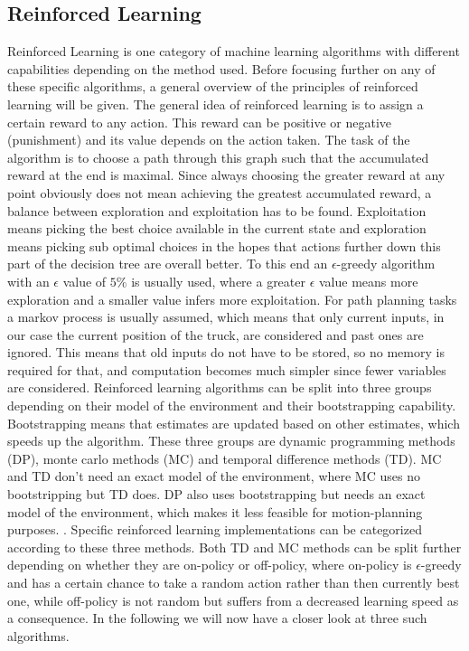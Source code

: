 \subsection{Reinforced Learning}
\label{sec:reinforced_learning}

Reinforced Learning is one category of machine learning algorithms with different capabilities depending on the method used. Before focusing further on any of these specific algorithms, a general overview of the principles of reinforced learning will be given. The general idea of reinforced learning is to assign a certain reward to any action. This reward can be positive or negative (punishment) and its value depends on the action taken. The task of the algorithm is to choose a path through this graph such that the accumulated reward at the end is maximal. Since always choosing the greater reward at any point obviously does not mean achieving the greatest accumulated reward, a balance between exploration and exploitation has to be found. Exploitation means picking the best choice available in the current state and exploration means picking sub optimal choices in the hopes that actions further down this part of the decision tree are overall better. To this end an $\epsilon$-greedy algorithm with an $\epsilon$ value of $5\%$ is usually used, where a greater $\epsilon$ value means more exploration and a smaller value infers more exploitation. For path planning tasks a markov process is usually assumed, which means that only current inputs, in our case the current position of the truck, are considered and past ones are ignored. This means that old inputs do not have to be stored, so no memory is required for that, and computation becomes much simpler since fewer variables are considered. Reinforced learning algorithms can be split into three groups depending on their model of the environment and their bootstrapping capability. Bootstrapping means that estimates are updated based on other estimates, which speeds up the algorithm. These three groups are dynamic programming methods (DP), monte carlo methods (MC) and temporal difference methods (TD). MC and TD don't need an exact model of the environment, where MC uses no bootstripping but TD does. DP also uses bootstrapping but needs an exact model of the environment, which makes it less feasible for motion-planning purposes.
\cite{9}. Specific reinforced learning implementations can be categorized according to these three methods. Both TD and MC methods can be split further depending on whether they are on-policy or off-policy, where on-policy is $\epsilon$-greedy and has a certain chance to take a random action rather than then currently best one, while off-policy is not random but suffers from a decreased learning speed as a consequence. In the following we will now have a closer look at three such algorithms.

